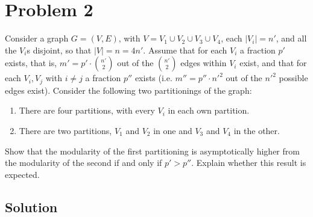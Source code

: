 
\section{Problem 2}

Consider a graph $G = (V,E)$, with $V = V_1 \cup V_2 \cup V_3 \cup V_4$, each $|V_i| = n'$, and all the $V_i$s disjoint, so that $|V| = n = 4n'$. Assume that for each $V_i$ a fraction $p'$ exists, that is, $m' = p'\cdot\binom{n'}{2}$ out of the $\binom{n'}{2}$ edges within $V_i$ exist, and that for each $V_i,V_j$ with $i \neq j$ a fraction $p''$ exists (i.e. $m'' = p'' \cdot n'^2$ out of the $n'^2$ possible edges exist). Consider the following two partitionings of the graph:
\begin{enumerate}
	\item There are four partitions, with every $V_i$ in each own partition.
	
	\item There are two partitions, $V_1$ and $V_2$ in one and $V_3$ and $V_4$ in the other.
\end{enumerate}
Show that the modularity of the first partitioning is asymptotically higher from the modularity of the second if and only if $p' > p''$. Explain whether this result is expected.


\subsection{Solution}

